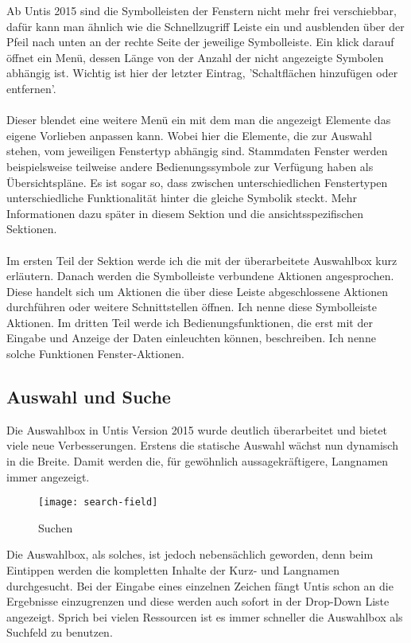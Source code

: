 Ab Untis 2015 sind die Symbolleisten der Fenstern nicht mehr frei verschiebbar, dafür kann man ähnlich wie die Schnellzugriff Leiste ein und ausblenden über der Pfeil nach unten an der rechte Seite der jeweilige Symbolleiste. Ein klick darauf öffnet ein Menü, dessen Länge von der Anzahl der nicht angezeigte Symbolen abhängig ist. Wichtig ist hier der letzter Eintrag, 'Schaltflächen hinzufügen oder entfernen'.\\
\\
Dieser blendet eine weitere Menü ein mit dem man die angezeigt Elemente das eigene Vorlieben anpassen kann. Wobei hier die Elemente, die zur Auswahl stehen, vom jeweiligen Fenstertyp abhängig sind. Stammdaten Fenster werden beispielsweise teilweise andere Bedienungssymbole zur Verfügung haben als Übersichtspläne. Es ist sogar so, dass zwischen unterschiedlichen Fenstertypen unterschiedliche Funktionalität hinter die gleiche Symbolik steckt. Mehr Informationen dazu später in diesem Sektion und die ansichtsspezifischen Sektionen.\\
\\
Im ersten Teil der Sektion werde ich die mit der überarbeitete Auswahlbox kurz erläutern. Danach werden die Symbolleiste verbundene Aktionen angesprochen. Diese handelt sich um Aktionen die über diese Leiste abgeschlossene Aktionen durchführen oder weitere Schnittstellen öffnen. Ich nenne diese Symbolleiste Aktionen. Im dritten Teil werde ich Bedienungsfunktionen, die erst mit der Eingabe und Anzeige der Daten einleuchten können, beschreiben. Ich nenne solche Funktionen Fenster-Aktionen.

\subsection{Auswahl und Suche}

Die Auswahlbox in Untis Version 2015 wurde deutlich überarbeitet und bietet viele neue Verbesserungen. Erstens die statische Auswahl wächst nun dynamisch in die Breite. Damit werden die, für gewöhnlich aussagekräftigere, Langnamen immer angezeigt.\\


\begin{wrapfigure}{r}{.4\textwidth}
	\vspace{-13pt}
	\texttt{[image: search-field]}
	\vspace{-5pt}
	\caption{Suchen}
	\label{fig:search-field}
\end{wrapfigure}

\noindent
Die Auswahlbox, als solches, ist jedoch nebensächlich geworden, denn beim Eintippen werden die kompletten Inhalte der Kurz- und Langnamen durchgesucht. Bei der Eingabe eines einzelnen Zeichen fängt Untis schon an die Ergebnisse einzugrenzen und diese werden auch sofort in der Drop-Down Liste angezeigt. Sprich bei vielen Ressourcen ist es immer schneller die Auswahlbox als Suchfeld zu benutzen.

